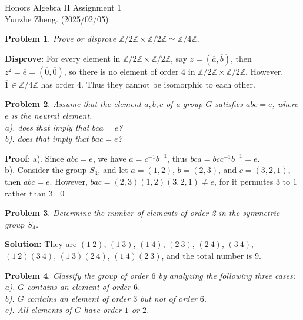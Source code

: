 \documentclass[12pt]{article}
\newtheorem{problem}{Problem}
\begin{document}
\noindent Honors Algebra II \hfill Assignment 1\\
Yunzhe Zheng. (2025/02/05)

\hrulefill

\begin{problem}
Prove or disprove $\mathbb{Z}/2\mathbb{Z} \times \mathbb{Z}/2\mathbb{Z}\simeq \mathbb{Z} / 4\mathbb{Z}$.
\end{problem}

\textbf{Disprove:} For every element in $\mathbb{Z}/2\mathbb{Z}\times\mathbb{Z}/2\mathbb{Z}$, say $z = (\overline{a}, \overline{b})$, then $z^{2} = \overline{e} = (\overline{0}, \overline{0})$, so there is no element of order $4$ in $\mathbb{Z}/2\mathbb{Z}\times\mathbb{Z}/2\mathbb{Z}$. However, $\overline{1}\in \mathbb{Z}/4\mathbb{Z}$ has order $4$. Thus they cannot be isomorphic to each other.
\\
\begin{problem}
Assume that the element $a, b, c$ of a group $G$ satisfies $abc = e$, where $e$ is the neutral element. \\
\indent a). does that imply that $bca = e$? \\
\indent b). does that imply that $bac = e$? 

\end{problem}

\textbf{Proof}: a). Since $abc = e$, we have $a = c^{-1}b^{-1}$, thus $bca = bcc^{-1}b^{-1}=e$. \\
\indent b). Consider the group $S_{3}$, and let $a = (1, 2)$, $b = (2, 3)$, and $c = (3, 2, 1)$, then $abc = e$. However, $bac = (2, 3)(1, 2)(3, 2, 1)\neq e$, for it permutes $3$ to $1$ rather than $3$. \qed
\\
\begin{problem}
Determine the number of elements of order 2 in the symmetric group $S_{4}$.
\end{problem}

\textbf{Solution:} They are $(1\ 2)$, $(1\ 3)$, $(1\ 4)$, $(2\ 3)$, $(2\ 4)$, $(3\ 4)$, $(1\ 2)(3\ 4)$, $(1\ 3)(2\ 4)$, $(1\ 4)(2\ 3)$, and the total number is $9$. 
\\
\begin{problem}
Classify the group of order $6$ by analyzing the following three cases: \\
\indent a). $G$ contains an element of order $6$. \\ 
\indent b). $G$ contains an element of order $3$ but not of order $6$. \\
\indent c). All elements of $G$ have order $1$ or $2$.

\end{problem}
\end{document}
